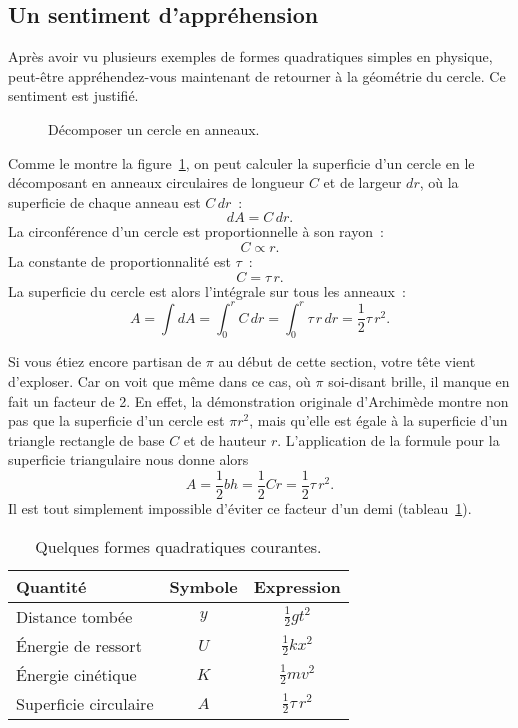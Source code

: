   \subsection{Un sentiment d'appréhension} %
  \label{sec:a_sense_of_foreboding}

Après avoir vu plusieurs exemples de formes quadratiques simples en physique, peut-être
appréhendez-vous maintenant de retourner à la géométrie du
cercle. Ce sentiment est justifié.

\begin{figure}
\begin{center}
\end{center}
\caption{Décomposer un cercle en anneaux.\label{fig:circular_area}}
\end{figure}


Comme le montre la figure~\ref{fig:circular_area}, on peut calculer la
superficie d'un cercle en le décomposant en anneaux circulaires de longueur $C$
et de largeur $dr$, où la superficie de chaque anneau est $C\,dr$~:
\[ dA = C\,dr. \]
La circonférence d'un cercle est proportionnelle à son rayon~:
\[ C \propto r. \]
La constante de proportionnalité est $\tau$~:
\[ C = \tau\,r. \]
La superficie du cercle est alors l'intégrale sur tous les anneaux~:
\[ A = \int dA = \int_0^r C\,dr = \int_0^r \tau\,r\,dr = \textstyle{\frac{1}{2}} \tau\,r^2. \]

Si vous étiez encore partisan de $\pi$ au début de cette section, votre tête vient
d'exploser. Car on voit que même dans ce cas, où $\pi$ soi-disant brille, il
manque en fait un facteur de 2. En effet, la démonstration originale
d'Archimède montre non pas que la superficie d'un cercle est $\pi r^2$, mais
qu'elle est égale à la superficie d'un triangle rectangle de base $C$ et de
hauteur $r$. L'application de la formule pour la superficie triangulaire nous donne
alors
\[
  A = \textstyle{\frac{1}{2}} bh = \textstyle{\frac{1}{2}}Cr = \textstyle{\frac{1}{2}}\tau\,r^2.
\]
Il est tout simplement impossible d'éviter ce facteur d'un demi
(tableau~\ref{table:quadratic_forms}).

\begin{table}
\begin{center}
\begin{tabular}{lcc}
Quantité & Symbole & Expression \\ \hline
Distance tombée & $y$ & $\textstyle{\frac{1}{2}}gt^2$ \smallskip \\
Énergie de ressort & $U$ & $\textstyle{\frac{1}{2}}kx^2$ \smallskip \\
Énergie cinétique & $K$ & $\textstyle{\frac{1}{2}}mv^2$ \smallskip \\
Superficie circulaire & $A$ & $\textstyle{\frac{1}{2}}\tau\,r^2$
\end{tabular}
\end{center}
\caption{Quelques formes quadratiques courantes.\label{table:quadratic_forms}}
\end{table}


